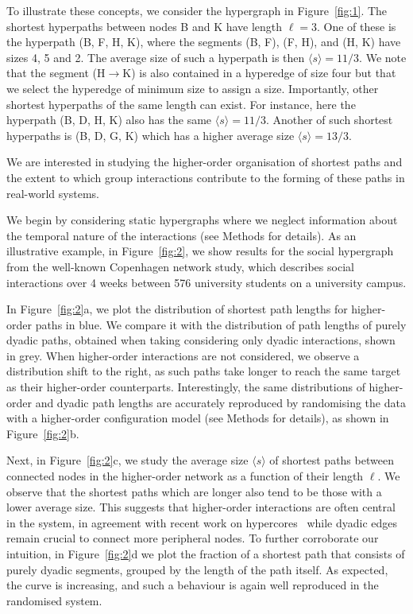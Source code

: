 \documentclass[a4paper,pre,reqno,superscriptaddress, twocolumn, floatfix]{revtex4}
\def\ho{higher-order }
\begin{document}
To illustrate these concepts, we consider the hypergraph in Figure~\ref{fig:1}. 
The shortest hyperpaths between nodes B and K have length $\ell=3$. One of these is the hyperpath (B, F, H, K), where the segments (B, F), (F, H), and (H, K) have sizes 4, 5 and 2.
The average size of such a hyperpath is then $\langle{s}\rangle=11/3$. We note that the segment (H$\to$K) is also contained in a hyperedge of size four but that we select the hyperedge of minimum size to assign a size. Importantly, other shortest hyperpaths of the same length can exist. For instance, here the hyperpath (B, D, H, K) also has the same $\langle{s}\rangle=11/3$. Another of such shortest hyperpaths is (B, D, G, K) which has a higher average size $\langle{s}\rangle=13/3$. 


We are interested in studying the \ho organisation of shortest paths and the extent to which group interactions contribute to the forming of these paths in real-world systems. 


We begin by considering static hypergraphs where we neglect information about the temporal nature of the interactions (see Methods for details). As an illustrative example, in Figure~\ref{fig:2}, we show results for the social hypergraph from the well-known Copenhagen network study, which describes social interactions over 4 weeks between 576 university students on a university campus. 



In Figure~\ref{fig:2}a, we plot the distribution of shortest path lengths for \ho paths in blue. We compare it with the distribution of path lengths of purely dyadic paths, obtained when taking considering only dyadic interactions, shown in grey.  
When \ho interactions are not considered,
we observe a distribution shift to the right, as such paths take longer to reach the same target as their \ho counterparts.
Interestingly, the same distributions of \ho and dyadic path lengths are accurately reproduced by randomising the data with a \ho configuration model (see Methods for details), as shown in Figure~\ref{fig:2}b. 



Next, in Figure~\ref{fig:2}c, we study the average size  $\langle{s}\rangle$ of shortest paths between connected nodes in the \ho network as a function of their length $\ell$. We observe that the shortest paths which are longer also tend to be those with a lower average size. 
This suggests that \ho interactions are often central in the system, in agreement with recent work on hypercores~\cite{mancastroppa2024hypercores} while dyadic edges remain crucial to connect more peripheral nodes. To further corroborate our intuition, in Figure~\ref{fig:2}d we plot the fraction of a shortest path that consists of purely dyadic segments, grouped by the length of the path itself. As expected, the curve is increasing, and such a behaviour is again well reproduced in the randomised system. 
\end{document}
